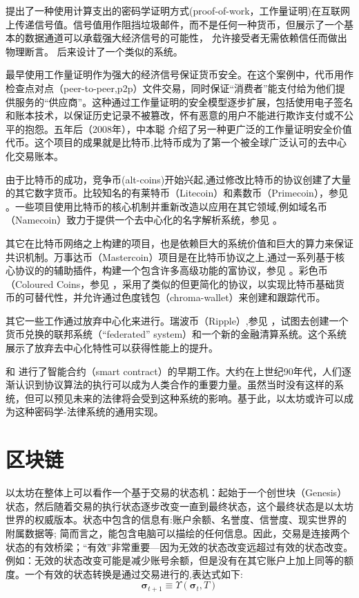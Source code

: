 \documentclass[9pt,oneside]{amsart}
\begin{document}
\begin{multicols}{2}
\cite{dwork92pricingvia} 提出了一种使用计算支出的密码学证明方式(proof-of-work，工作量证明)在互联网上传递信号值。信号值用作阻挡垃圾邮件，而不是任何一种货币，但展示了一个基本的数据通道可以承载强大经济信号的可能性， 允许接受者无需依赖信任而做出物理断言。\cite{back2002hashcash} 后来设计了一个类似的系统。

\cite{vishnumurthy03karma:a} 最早使用工作量证明作为强大的经济信号保证货币安全。在这个案例中，代币用作检查点对点（peer-to-peer,p2p）文件交易，同时保证“消费者”能支付给为他们提供服务的“供应商”。这种通过工作量证明的安全模型逐步扩展，包括使用电子签名和账本技术，以保证历史记录不被篡改，怀有恶意的用户不能进行欺诈支付或不公平的抱怨。五年后（2008年），中本聪\cite{nakamoto2008bitcoin} 介绍了另一种更广泛的工作量证明安全价值代币。这个项目的成果就是比特币,比特币成为了第一个被全球广泛认可的去中心化交易账本。

由于比特币的成功，竞争币(alt-coins)开始兴起,通过修改比特币的协议创建了大量的其它数字货币。比较知名的有莱特币（Litecoin）和素数币（Primecoin），参见 \cite{sprankel2013technical} 。一些项目使用比特币的核心机制并重新改造以应用在其它领域,例如域名币（Namecoin）致力于提供一个去中心化的名字解析系统，参见 \cite{aron2012bitcoin} 。

其它在比特币网络之上构建的项目，也是依赖巨大的系统价值和巨大的算力来保证共识机制。万事达币（Mastercoin）项目是在比特币协议之上,通过一系列基于核心协议的的辅助插件，构建一个包含许多高级功能的富协议，参见 \cite{mastercoin2013willett}。彩色币（Coloured Coins，参见 \cite{colouredcoins2012rosenfeld}，采用了类似的但更简化的协议，以实现比特币基础货币的可替代性，并允许通过色度钱包（chroma-wallet）来创建和跟踪代币。

其它一些工作通过放弃中心化来进行。瑞波币（Ripple）,参见 \cite{boutellier2014pirates}，试图去创建一个货币兑换的联邦系统（“federated” system）和一个新的金融清算系统。这个系统展示了放弃去中心化特性可以获得性能上的提升。

\cite{szabo1997formalizing} 和 \cite{miller1997future} 进行了智能合约（smart contract）的早期工作。大约在上世纪90年代，人们逐渐认识到协议算法的执行可以成为人类合作的重要力量。虽然当时没有这样的系统，但可以预见未来的法律将会受到这种系统的影响。基于此，以太坊或许可以成为这种密码学-法律系统的通用实现。


\section{区块链} \label{ch:overview}

以太坊在整体上可以看作一个基于交易的状态机：起始于一个创世块（Genesis）状态，然后随着交易的执行状态逐步改变一直到最终状态，这个最终状态是以太坊世界的权威版本。状态中包含的信息有:账户余额、名誉度、信誉度、现实世界的附属数据等; 简而言之，能包含电脑可以描绘的任何信息。因此，交易是连接两个状态的有效桥梁；“有效”非常重要---因为无效的状态改变远超过有效的状态改变。例如：无效的状态改变可能是减少账号余额，但是没有在其它账户上加上同等的额度。一个有效的状态转换是通过交易进行的,表达式如下:
\begin{equation}
\boldsymbol{\sigma}_{t+1} \equiv \Upsilon(\boldsymbol{\sigma}_t, T)
\end{equation}



\end{multicols}
\end{document}
